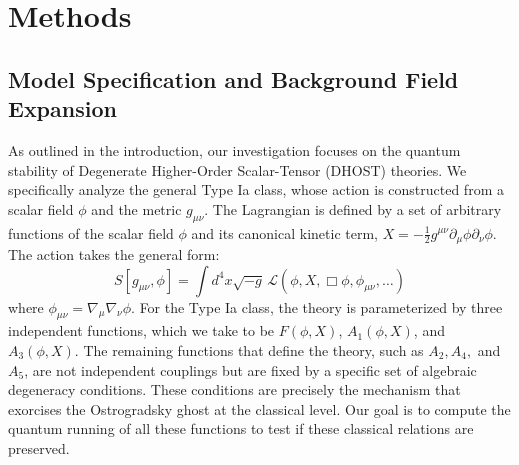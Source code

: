 \documentclass[twocolumn]{aastex631}
\begin{document}
\section{Methods}
\label{sec:methods}
\subsection{Model Specification and Background Field Expansion}

As outlined in the introduction, our investigation focuses on the quantum stability of Degenerate Higher-Order Scalar-Tensor (DHOST) theories. We specifically analyze the general Type Ia class, whose action is constructed from a scalar field $\phi$ and the metric $g_{\mu\nu}$. The Lagrangian is defined by a set of arbitrary functions of the scalar field $\phi$ and its canonical kinetic term, $X = - \frac{1}{2} g^{\mu\nu} \partial_\mu\phi \partial_\nu\phi$. The action takes the general form:
\begin{equation}
    S[g_{\mu\nu}, \phi] = \int d^4x \sqrt{-g} \, \mathcal{L}(\phi, X, \Box\phi, \phi_{\mu\nu}, \dots)
\end{equation}
where $\phi_{\mu\nu} = \nabla_\mu \nabla_\nu \phi$. For the Type Ia class, the theory is parameterized by three independent functions, which we take to be $F(\phi, X)$, $A_1(\phi, X)$, and $A_3(\phi, X)$. The remaining functions that define the theory, such as $A_2, A_4,$ and $A_5$, are not independent couplings but are fixed by a specific set of algebraic degeneracy conditions. These conditions are precisely the mechanism that exorcises the Ostrogradsky ghost at the classical level. Our goal is to compute the quantum running of all these functions to test if these classical relations are preserved.
\end{document}
